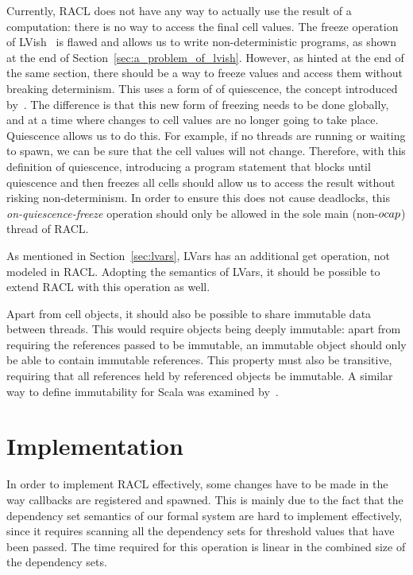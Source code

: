 Currently, RACL does not have any way to actually use the result of a
computation: there is no way to access the final cell values. The
freeze operation of LVish~\parencite{kuper2014freeze} is flawed and allows us to
write non-deterministic programs, as shown at the end of
Section~\ref{sec:a_problem_of_lvish}. However, as hinted at the end of the same
section, there should be a way to freeze values and access them without breaking
determinism.  This uses a form of of quiescence, the concept introduced
by~\textcite{kuper2014freeze}. The difference is that this new form of freezing
needs to be done globally, and at a time where changes to cell values are no
longer going to take place. Quiescence allows us to do this. For example, if no
threads are running or waiting to spawn, we can be sure that the cell values
will not change. Therefore, with this definition of quiescence, introducing a
program statement that blocks until quiescence and then freezes all cells
should allow us to access the result without risking non-determinism. In order
to ensure this does not cause deadlocks, this \emph{on-quiescence-freeze}
operation should only be allowed in the sole main (non-$\mbox{$ocap$}$) thread of RACL.

As mentioned in Section~\ref{sec:lvars}, LVars has an additional get
operation, not modeled in RACL. Adopting the semantics of LVars, it should be
possible to extend RACL with this operation as well.

Apart from cell objects, it should also be possible to share immutable data
between threads. This would require objects being deeply immutable: apart from
requiring the references passed to be immutable, an immutable object should only be able
to contain immutable references. This property must also be transitive,
requiring that all references held by referenced objects be immutable. A similar way
to define immutability for Scala was examined by~\textcite{HallerA17}.

\section{Implementation}%
\label{sec:implementation}

In order to implement RACL effectively, some changes have to be made in the way
callbacks are registered and spawned. This is mainly due to the fact that the dependency
set semantics of our formal system are hard to implement effectively, since it
requires scanning all the dependency sets for threshold values that have been
passed. The time required for this operation is linear in the combined size of
the dependency sets.  

